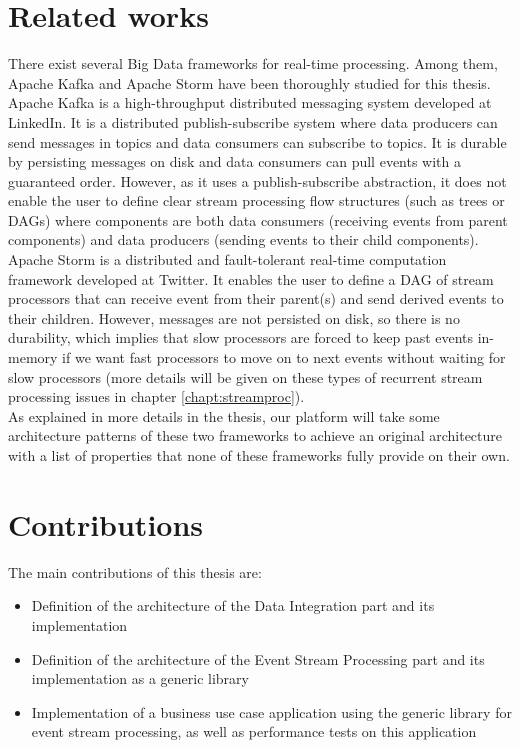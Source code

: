 \section{Related works}

There exist several Big Data frameworks for real-time processing. Among them, Apache Kafka  and Apache Storm  have been thoroughly studied for this thesis.
\\

Apache Kafka is a high-throughput distributed messaging system developed at LinkedIn. It is a distributed publish-subscribe system where data producers can send messages in topics and data consumers can subscribe to topics. It is durable by persisting messages on disk and data consumers can pull events with a guaranteed order. However, as it uses a publish-subscribe abstraction, it does not enable the user to define clear stream processing flow structures (such as trees or DAGs) where components are both data consumers (receiving events from parent components) and data producers (sending events to their child components).
\\

Apache Storm is a distributed and fault-tolerant real-time computation framework developed at Twitter. It enables the user to define a DAG of stream processors that can receive event from their parent(s) and send derived events to their children. However, messages are not persisted on disk, so there is no durability, which implies that slow processors are forced to keep past events in-memory if we want fast processors to move on to next events without waiting for slow processors (more details will be given on these types of recurrent stream processing issues in chapter \ref{chapt:streamproc}).
\\

As explained in more details in the thesis, our platform will take some architecture patterns of these two frameworks to achieve an original architecture with a list of properties that none of these frameworks fully provide on their own.

\section{Contributions}

The main contributions of this thesis are:
\begin{itemize}
  \item Definition of the architecture of the Data Integration part and its implementation
  \item Definition of the architecture of the Event Stream Processing part and its implementation as a generic library
  \item Implementation of a business use case application using the generic library for event stream processing, as well as performance tests on this application
\end{itemize}




